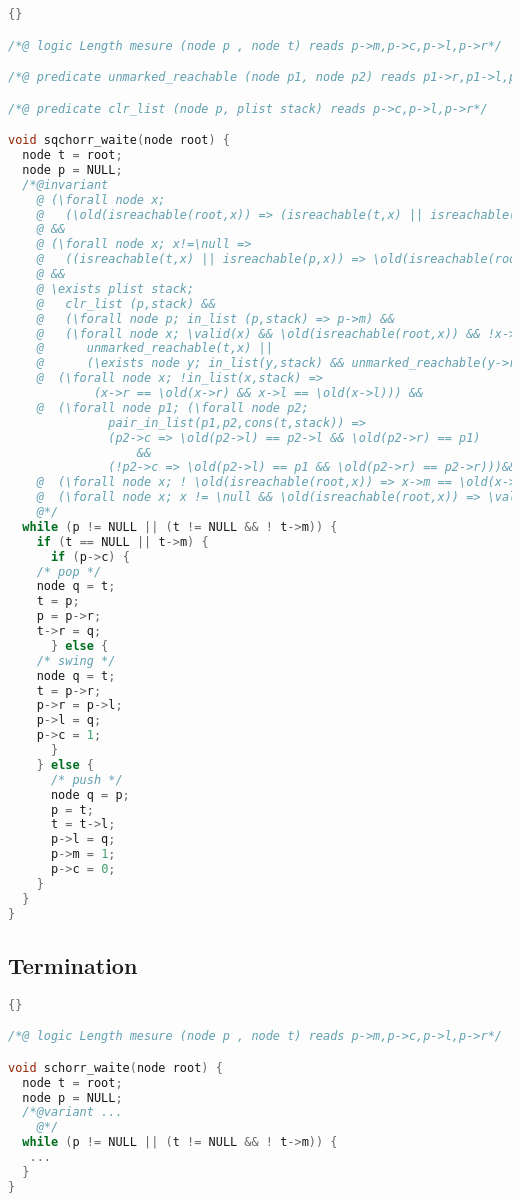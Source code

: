 \begin{lstlisting}[language=C]{}

/*@ logic Length mesure (node p , node t) reads p->m,p->c,p->l,p->r*/

/*@ predicate unmarked_reachable (node p1, node p2) reads p1->r,p1->l,p1->m */

/*@ predicate clr_list (node p, plist stack) reads p->c,p->l,p->r*/

void sqchorr_waite(node root) {
  node t = root;
  node p = NULL;
  /*@invariant
    @ (\forall node x; 
    @   (\old(isreachable(root,x)) => (isreachable(t,x) || isreachable(p,x))))
    @ &&
    @ (\forall node x; x!=\null => 
    @   ((isreachable(t,x) || isreachable(p,x)) => \old(isreachable(root,x)))) 
    @ &&
    @ \exists plist stack;
    @   clr_list (p,stack) &&
    @   (\forall node p; in_list (p,stack) => p->m) &&
    @   (\forall node x; \valid(x) && \old(isreachable(root,x)) && !x->m =>
    @      unmarked_reachable(t,x) || 
    @      (\exists node y; in_list(y,stack) && unmarked_reachable(y->r,x))) &&
    @  (\forall node x; !in_list(x,stack) =>  
            (x->r == \old(x->r) && x->l == \old(x->l))) &&
    @  (\forall node p1; (\forall node p2;
              pair_in_list(p1,p2,cons(t,stack)) => 
	          (p2->c => \old(p2->l) == p2->l && \old(p2->r) == p1)
                  &&
	          (!p2->c => \old(p2->l) == p1 && \old(p2->r) == p2->r)))&&
    @  (\forall node x; ! \old(isreachable(root,x)) => x->m == \old(x->m)) &&
    @  (\forall node x; x != \null && \old(isreachable(root,x)) => \valid(x)) 
    @*/
  while (p != NULL || (t != NULL && ! t->m)) {
    if (t == NULL || t->m) {
      if (p->c) {
	/* pop */
	node q = t;
	t = p;
	p = p->r;
	t->r = q;
      } else {
	/* swing */
	node q = t;
	t = p->r;
	p->r = p->l;
	p->l = q;
	p->c = 1;
      }
    } else {
      /* push */
      node q = p;
      p = t;
      t = t->l;
      p->l = q;
      p->m = 1;
      p->c = 0;
    }
  }
}
\end{lstlisting}

\subsection{Termination}

\begin{lstlisting}[language=C]{}

/*@ logic Length mesure (node p , node t) reads p->m,p->c,p->l,p->r*/

void schorr_waite(node root) {
  node t = root;
  node p = NULL;
  /*@variant ...
    @*/
  while (p != NULL || (t != NULL && ! t->m)) {
   ...
  }
}
\end{lstlisting}

